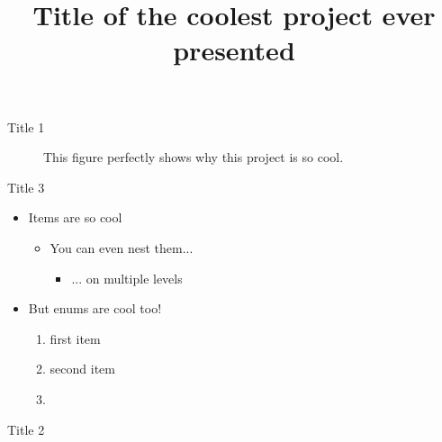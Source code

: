 \documentclass{femtoposter}
\title{Title of the coolest project ever presented}
\begin{document}
	\begin{block}{Title 1}
		\blindtext
	\end{block}
	\begin{block}{}
		\centering
		\begin{figure}
			\centering
			\caption{This figure perfectly shows why this project is so cool.}
		\end{figure}
	\end{block}
	\begin{block}{Title 3}
		\begin{itemize}
			\item Items are so cool
				\begin{itemize}
					\item You can even nest them...
						\begin{itemize}
							\item ... on multiple levels
						\end{itemize}
				\end{itemize}
			\item But enums are cool too!
				\begin{enumerate}
					\item first item
					\item second item
					\item \blindtext
				\end{enumerate}
		\end{itemize}
	\end{block}

	\secondcolumn

	\begin{block}{}
		\centering
	\end{block}
	\begin{block}{Title 2}
		\blindtext
	\end{block}
	\begin{block}{}
		\centering
	\end{block}
\end{document}
